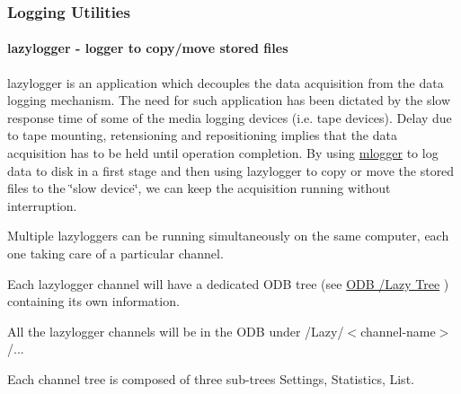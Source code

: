 \label{index_end}
\hypertarget{index_end}{}
 \subsubsection{Logging Utilities}\label{F_LogUtil}
\par
 

\par
 \label{F_LogUtil_idx_Logging_lazylogger}
\hypertarget{F_LogUtil_idx_Logging_lazylogger}{}
 \label{F_LogUtil_idx_lazylogger-utility}
\hypertarget{F_LogUtil_idx_lazylogger-utility}{}
 \hypertarget{F_LogUtil_F_lazylogger_utility}{}\paragraph{lazylogger  -\/ logger to copy/move stored files}\label{F_LogUtil_F_lazylogger_utility}
lazylogger is an application which decouples the data acquisition from the data logging mechanism. The need for such application has been dictated by the slow response time of some of the media logging devices (i.e. tape devices). Delay due to tape mounting, retensioning and repositioning implies that the data acquisition has to be held until operation completion. By using \hyperlink{F_Logging_F_mlogger_utility}{mlogger} to log data to disk in a first stage and then using lazylogger to copy or move the stored files to the \char`\"{}slow device\char`\"{}, we can keep the acquisition running without interruption.
\begin{DoxyItemize}
\item Multiple lazyloggers can be running simultaneously on the same computer, each one taking care of a particular channel.
\item Each lazylogger channel will have a dedicated ODB tree (see \hyperlink{F_LogUtil_F_ODB_Lazy_Tree}{ODB /Lazy Tree} ) containing its own information.
\item All the lazylogger channels will be in the ODB under /Lazy/$<$channel-\/name$>$/...
\item Each channel tree is composed of three sub-\/trees Settings, Statistics, List.
\end{DoxyItemize}

